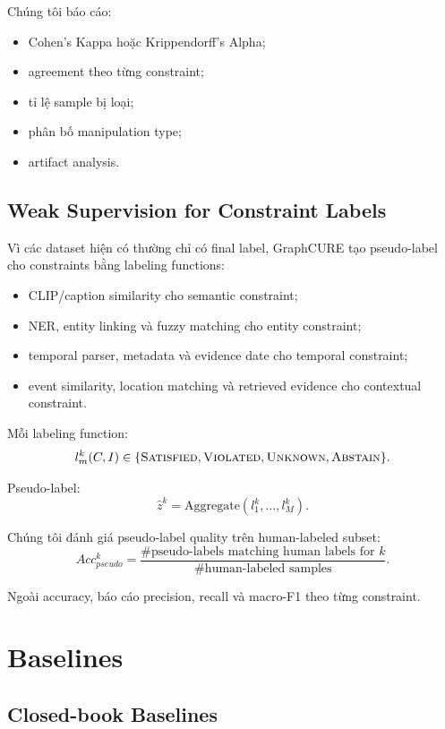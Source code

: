 \documentclass[11pt,a4paper]{article}
\newcommand{\Sat}{\textsc{Satisfied}}
\newcommand{\Viol}{\textsc{Violated}}
\newcommand{\Unk}{\textsc{Unknown}}
\newcommand{\Abstain}{\textsc{Abstain}}
\begin{document}
Chúng tôi báo cáo:

\begin{itemize}[leftmargin=1.5em]
\item Cohen's Kappa hoặc Krippendorff's Alpha;
\item agreement theo từng constraint;
\item tỉ lệ sample bị loại;
\item phân bố manipulation type;
\item artifact analysis.
\end{itemize}

\subsection{Weak Supervision for Constraint Labels}

Vì các dataset hiện có thường chỉ có final label, GraphCURE tạo pseudo-label cho constraints bằng labeling functions:

\begin{itemize}[leftmargin=1.5em]
\item CLIP/caption similarity cho semantic constraint;
\item NER, entity linking và fuzzy matching cho entity constraint;
\item temporal parser, metadata và evidence date cho temporal constraint;
\item event similarity, location matching và retrieved evidence cho contextual constraint.
\end{itemize}

Mỗi labeling function:
\[
l_m^k(C,I)\in\{\Sat,\Viol,\Unk,\Abstain\}.
\]

Pseudo-label:
\[
\hat{z}^k=\text{Aggregate}(l_1^k,\ldots,l_M^k).
\]

Chúng tôi đánh giá pseudo-label quality trên human-labeled subset:
\[
Acc_{pseudo}^{k}
=
\frac{
\#\text{pseudo-labels matching human labels for }k
}{
\#\text{human-labeled samples}
}.
\]

Ngoài accuracy, báo cáo precision, recall và macro-F1 theo từng constraint.

\section{Baselines}

\subsection{Closed-book Baselines}
\end{document}
